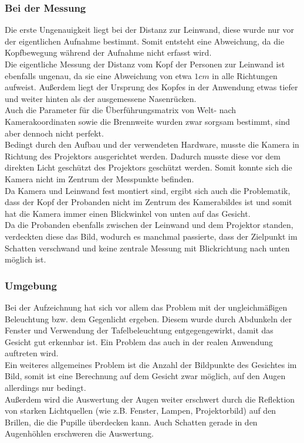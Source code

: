 \subsubsection{Bei der Messung}
Die erste Ungenauigkeit liegt bei der Distanz zur Leinwand, diese wurde nur vor der eigentlichen Aufnahme bestimmt. Somit entsteht eine Abweichung, da die Kopfbewegung während der Aufnahme nicht erfasst wird.\\
Die eigentliche Messung der Distanz  vom Kopf der Personen zur Leinwand ist ebenfalls ungenau, da sie eine Abweichung von etwa $1cm$ in alle Richtungen aufweist. Außerdem liegt der Ursprung des Kopfes in der Anwendung etwas tiefer und weiter hinten als der ausgemessene Nasenrücken.\\
Auch die Parameter für die Überführungsmatrix von Welt- nach Kamerakoordinaten sowie die Brennweite wurden zwar sorgsam bestimmt, sind aber dennoch nicht perfekt.\\
Bedingt durch den Aufbau und der verwendeten Hardware, musste die Kamera in Richtung des Projektors ausgerichtet werden.  Dadurch musste diese vor dem direkten Licht geschützt des Projektors geschützt werden. Somit konnte sich die Kamera nicht im Zentrum der Messpunkte befinden.\\
Da Kamera und Leinwand fest montiert sind, ergibt sich auch die Problematik, dass der Kopf der Probanden nicht im Zentrum des Kamerabildes ist und somit hat die Kamera immer einen Blickwinkel von unten auf das Gesicht.\\
Da die Probanden ebenfalls zwischen der Leinwand und dem Projektor standen, verdeckten diese das Bild, wodurch es manchmal passierte, dass der Zielpunkt im Schatten verschwand und keine zentrale Messung mit Blickrichtung nach unten möglich ist.
\subsubsection{Umgebung}
Bei der Aufzeichnung hat sich vor allem das Problem mit der ungleichmäßigen Beleuchtung bzw. dem Gegenlicht ergeben. Diesem wurde durch Abdunkeln der Fenster und Verwendung der Tafelbeleuchtung entgegengewirkt, damit das Gesicht gut erkennbar ist. Ein Problem das auch in der realen Anwendung auftreten wird.\\
Ein weiteres allgemeines Problem ist die Anzahl der Bildpunkte des Gesichtes im Bild, somit ist eine Berechnung auf dem Gesicht zwar möglich, auf den Augen allerdings nur bedingt.\\
Außerdem wird die Auswertung der Augen weiter erschwert durch die Reflektion von starken Lichtquellen (wie z.B. Fenster, Lampen, Projektorbild) auf den Brillen, die die Pupille überdecken kann. Auch Schatten gerade in den Augenhöhlen erschweren die Auswertung.